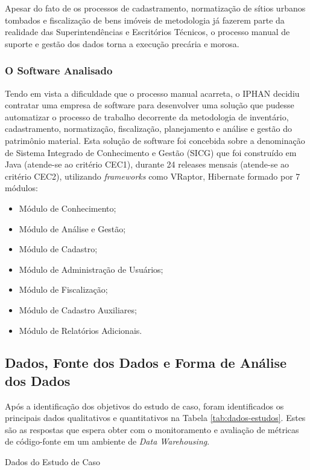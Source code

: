 Apesar do fato de os processos de cadastramento, normatização de sítios urbanos tombados e fiscalização de bens imóveis de metodologia já fazerem parte da realidade das Superintendências e Escritórios Técnicos, o processo manual de suporte e gestão dos dados torna a execução precária e morosa.



\subsubsection{O Software Analisado}
Tendo em vista a dificuldade que o processo manual acarreta, o IPHAN decidiu contratar uma empresa de software para desenvolver uma solução que pudesse automatizar o processo de trabalho decorrente da metodologia de inventário, cadastramento, normatização, fiscalização, planejamento e análise e gestão do patrimônio material. Esta solução de software foi concebida sobre a denominação de Sistema Integrado de Conhecimento e Gestão (SICG) que foi construído em Java (atende-se ao critério CEC1), durante 24 releases mensais (atende-se ao critério CEC2), utilizando \textit{frameworks} como VRaptor, Hibernate formado por 7 módulos:

\begin{itemize}
\item Módulo de Conhecimento;
\item Módulo de Análise e Gestão;
\item Módulo de Cadastro;
\item Módulo de Administração de Usuários;
\item Módulo de Fiscalização;
\item Módulo de Cadastro Auxiliares;
\item Módulo de Relatórios Adicionais.
\end{itemize}


\subsection{Dados, Fonte dos Dados e Forma de Análise dos Dados}

Após a identificação dos objetivos do estudo de caso, foram identificados os principais dados qualitativos e quantitativos na Tabela \ref{tab:dados-estudos}. Estes são as respostas que espera obter com o monitoramento e avaliação de métricas de código-fonte em um ambiente de \textit{Data Warehousing}.


\begin{table}[H]
\begin{center}

\caption{Dados do Estudo de Caso}
\label{tab:dados-estudos}
\end{center}
\end{table}
\FloatBarrier

